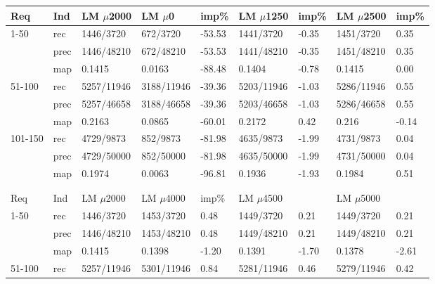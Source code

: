 \documentclass[a4paper]{article}
\begin{document}
\begin{table}[htp]
\centering
\begin{tabular}{|l|l|l|l|l|l|l|l|l|}
\hline
Req & Ind & LM $\mu$2000 & LM $\mu$0    & imp\%  & LM $\mu$1250 & imp\% & LM $\mu$2500 & imp\% \\ \hline
1-50    & rec    & 1446/3720  & 672/3720   & -53.53 & 1441/3720  & -0.35 & 1451/3720  & 0.35  \\ \hline
        & prec & 1446/48210 & 672/48210  & -53.53 & 1441/48210 & -0.35 & 1451/48210 & 0.35  \\ \hline
        & map       & 0.1415     & 0.0163     & -88.48 & 0.1404     & -0.78 & 0.1415     & 0.00  \\ \hline
51-100  & rec    & 5257/11946 & 3188/11946 & -39.36 & 5203/11946 & -1.03 & 5286/11946 & 0.55  \\ \hline
        & prec & 5257/46658 & 3188/46658 & -39.36 & 5203/46658 & -1.03 & 5286/46658 & 0.55  \\ \hline
        & map       & 0.2163     & 0.0865     & -60.01 & 0.2172     & 0.42  & 0.216      & -0.14 \\ \hline
101-150 & rec    & 4729/9873  & 852/9873   & -81.98 & 4635/9873  & -1.99 & 4731/9873  & 0.04  \\ \hline
        & prec & 4729/50000 & 852/50000  & -81.98 & 4635/50000 & -1.99 & 4731/50000 & 0.04  \\ \hline
        & map       & 0.1974     & 0.0063     & -96.81 & 0.1936     & -1.93 & 0.1984     & 0.51  \\ \hline
        &           &            &            &          &            &         &            &         \\ \hline
        &           &            &            &          &            &         &            &         \\ \hline
Req & Ind & LM $\mu$2000 & LM $\mu$4000 & imp\%  & LM $\mu$4500 &         & LM $\mu$5000 &         \\ \hline
1-50    & rec    & 1446/3720  & 1453/3720  & 0.48   & 1449/3720  & 0.21  & 1449/3720  & 0.21  \\ \hline
        & prec & 1446/48210 & 1453/48210 & 0.48   & 1449/48210 & 0.21  & 1449/48210 & 0.21  \\ \hline
        & map       & 0.1415     & 0.1398     & -1.20  & 0.1391     & -1.70 & 0.1378     & -2.61 \\ \hline
51-100  & rec    & 5257/11946 & 5301/11946 & 0.84   & 5281/11946 & 0.46  & 5279/11946 & 0.42  \\ \hline

\end{tabular}
\end{table}
\end{document}
